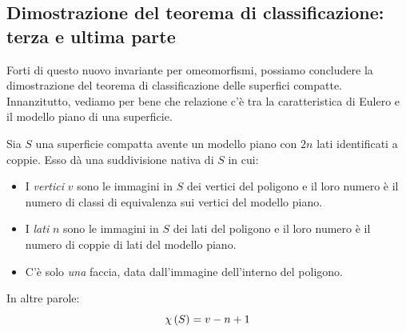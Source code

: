 \subsection{Dimostrazione del teorema di classificazione: terza e ultima parte}
Forti di questo nuovo invariante per omeomorfismi, possiamo concludere la dimostrazione del teorema di classificazione delle superfici compatte.\\
Innanzitutto, vediamo per bene che relazione c'è tra la caratteristica di Eulero e il modello piano di una superficie.
\begin{observe}
	Sia $S$ una superficie compatta avente un modello piano con $2n$ lati identificati a coppie. Esso dà una suddivisione nativa di $S$ in cui:
	\begin{itemize}
		\item I \textit{vertici} $v$ sono le immagini in $S$ dei vertici del poligono e il loro numero è il numero di classi di equivalenza sui vertici del modello piano.
		\item I \textit{lati} $n$ sono le immagini in $S$ dei lati del poligono  e il loro numero è il numero di coppie di lati del modello piano.
		\item C'è solo \textit{una} faccia, data dall'immagine dell'interno del poligono.
	\end{itemize}
In altre parole:
\begin{equation}
	\euler{S}{\ }=v-n+1
\end{equation}
\vspace{-6mm}
\end{observe}

